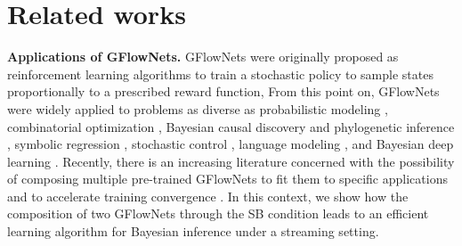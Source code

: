 \documentclass{article}
\newcommand{\pp}[1]{\vspace{0pt}\noindent\textbf{#1}}
\theoremstyle{plain}
\theoremstyle{definition}
\theoremstyle{remark}
\theoremstyle{remark}
\begin{document}
\section{Related works} \label{sec:aa} 
\renewcommand{\pp}[1]{\noindent\textbf{#1}}

\pp{Applications of GFlowNets.} GFlowNets \cite{Foundations, Bengio2021, theory} were originally proposed as reinforcement learning algorithms to train a stochastic policy to sample states proportionally to a prescribed reward function, %
From this point on, GFlowNets were widely applied to problems as diverse as probabilistic modeling \cite{ discretegfn_ii, discretegfn_iii}, combinatorial optimization \cite{Zhang2023}, Bayesian causal discovery \cite{deleu2022bayesian, deleu2023joint} and phylogenetic inference \cite{zhou2024phylogfn}, symbolic regression \cite{li2023gfnsr}, stochastic control \cite{theory}, language modeling \cite{hu2023amortizing}, and Bayesian deep learning \cite{liu2023dropout}. 
Recently, there is an increasing literature concerned with the possibility of composing multiple pre-trained GFlowNets to fit them to specific applications \cite{garipov2023compositional} and to accelerate training convergence \cite{lau2023dgfn}. In this context, we show how the composition of two GFlowNets through the SB condition leads to an efficient learning algorithm for Bayesian inference under a streaming setting.  


\end{document}
